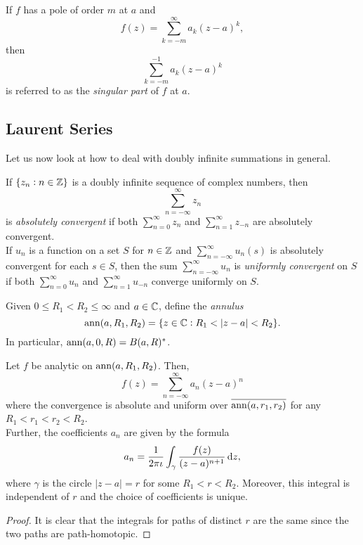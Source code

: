 		\begin{definition}
			If $f$ has a pole of order $m$ at $a$ and
			\[ f(z) = \sum_{k=-m}^{\infty} a_{k} (z-a)^k, \]
			then
			\[ \sum_{k=-m}^{-1} a_k (z-a)^k \]
			is referred to as the \emph{singular part} of $f$ at $a$.
		\end{definition}

	\subsection{Laurent Series}

		Let us now look at how to deal with doubly infinite summations in general.

		\begin{definition}
			If $\{ z_n : n \in \mathbb{Z} \}$ is a doubly infinite sequence of complex numbers, then
			\[ \sum_{n=-\infty}^{\infty} z_n \]
			is \emph{absolutely convergent} if both $\sum_{n=0}^\infty z_n$ and $\sum_{n=1}^\infty z_{-n}$ are absolutely convergent. \\
			If $u_n$ is a function on a set $S$ for $n \in \mathbb{Z}$ and $\sum_{n=-\infty}^{\infty} u_n(s)$ is absolutely convergent for each $s \in S$, then the sum $\sum_{n=-\infty}^{\infty} u_n$ is \emph{uniformly convergent} on $S$ if both $\sum_{n=0}^{\infty} u_n$ and $\sum_{n=1}^{\infty} u_{-n}$ converge uniformly on $S$.
		\end{definition}
		
		Given $0 \le R_1 < R_2 \le \infty$ and $a \in \mathbb{C}$, define the \emph{annulus}
		\[ \operatorname{ann}(a,R_1,R_2) = \{ z \in \mathbb{C} : R_1 < |z-a| < R_2 \}. \]
		In particular, $\operatorname{ann}(a,0,R) = B(a,R)^*$.

		\begin{theorem}
			Let $f$ be analytic on $\operatorname{ann}(a,R_1,R_2)$. Then,
			\[ f(z) = \sum_{n=-\infty}^{\infty} a_n (z-a)^n \]
			where the convergence is absolute and uniform over $\overline{\operatorname{ann}(a,r_1,r_2)}$ for any $R_1 < r_1 < r_2 < R_2$.\\
			Further, the coefficients $a_n$ are given by the formula
			\[ a_n = \frac{1}{2\pi\iota} \int_{\gamma} \frac{f(z)}{(z-a)^{n+1}} \dif z, \]
			where $\gamma$ is the circle $|z-a| = r$ for some $R_1 < r < R_2$. Moreover, this integral is independent of $r$ and the choice of coefficients is unique.
		\end{theorem}

		\begin{proof}
			It is clear that the integrals for paths of distinct $r$ are the same since the two paths are path-homotopic.
		\end{proof}